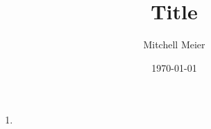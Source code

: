 \documentclass[journal,12pt,onecolumn,draftclsnofoot,]{IEEEtran}
\title{Title}
\author{Mitchell Meier}
\date{\today}
\begin{document}
\maketitle

\begin{enumerate}

\item

\end{enumerate}
\end{document}
